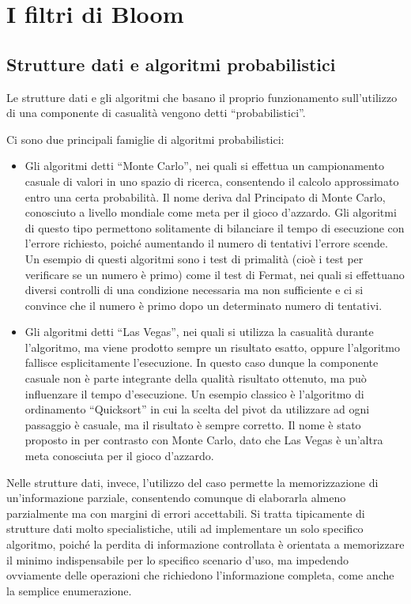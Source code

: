\chapter{I filtri di Bloom}

\section{Strutture dati e algoritmi probabilistici}

Le strutture dati e gli algoritmi che basano il proprio funzionamento sull'utilizzo di una componente
di casualità vengono detti ``probabilistici''. 

Ci sono due principali famiglie di algoritmi probabilistici:

\begin{itemize}
	\medskip

	\item Gli algoritmi detti ``Monte Carlo'', nei quali si effettua un campionamento casuale di
	valori in uno spazio di ricerca, consentendo il calcolo approssimato entro una certa
	probabilità. Il nome deriva dal Principato di Monte Carlo, conosciuto a livello mondiale come
	meta per il gioco d'azzardo. Gli algoritmi di questo tipo permettono solitamente di bilanciare
	il tempo di esecuzione con l'errore richiesto, poiché aumentando il numero di tentativi l'errore
	scende. Un esempio di questi algoritmi sono i test di primalità (cioè i test per verificare se
	un numero è primo) come il test di Fermat, nei quali si effettuano diversi controlli di una
	condizione necessaria ma non sufficiente e ci si convince che il numero è primo dopo un
	determinato numero di tentativi.

	\item Gli algoritmi detti ``Las Vegas'', nei quali si utilizza la casualità durante l'algoritmo,
	ma viene prodotto sempre un risultato esatto, oppure l'algoritmo fallisce esplicitamente
	l'esecuzione. In questo caso dunque la componente casuale non è parte integrante della qualità
	risultato ottenuto, ma può influenzare il tempo d'esecuzione. Un esempio classico è l'algoritmo
	di ordinamento ``Quicksort'' in cui la scelta del pivot da utilizzare ad ogni passaggio è
	casuale, ma il risultato è sempre corretto. Il nome è stato proposto in \cite{lasvegas} per
	contrasto con Monte Carlo, dato che Las Vegas è un'altra meta conosciuta per il gioco d'azzardo.
\end{itemize}

Nelle strutture dati, invece, l'utilizzo del caso permette la memorizzazione di un'informazione
parziale, consentendo comunque di elaborarla almeno parzialmente ma con margini di errori
accettabili. Si tratta tipicamente di strutture dati molto specialistiche, utili ad implementare un
solo specifico algoritmo, poiché la perdita di informazione controllata è orientata a memorizzare il
minimo indispensabile per lo specifico scenario d'uso, ma impedendo ovviamente delle operazioni che
richiedono l'informazione completa, come anche la semplice enumerazione.

